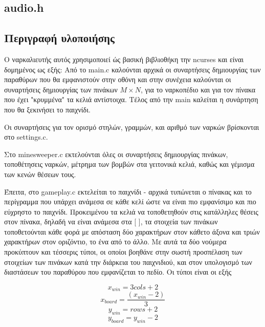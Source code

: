 \documentclass{article}
\begin{document}
    \subsection{audio.h}
        

    \subsection{Περιγραφή υλοποιήσης}

    Ο ναρκαλιευτής αυτός χρησιμοποιεί ώς βασική βιβλιοθήκη την ncurses και είναι δομημένος ως εξής:
    Από το main.c καλούνται αρχικά οι συναρτήσεις δημιουργίας των παραθύρων που θα εμφανιστούν
    στην οθόνη και στην συνέχεια καλούνται οι συναρτήσεις δημιουργίας των πινάκων $Μ \times N$,
    για το ναρκοπέδιο και για τον πίνακα που έχει "κρυμμένα" τα κελιά αντίστοιχα.
    Τέλος από την main καλείται η συνάρτηση που θα ξεκινήσει το παιχνίδι.  

    Οι συναρτήσεις για τον ορισμό στηλών, γραμμών, και αριθμό των ναρκών βρίσκονται στο settings.c.  

    Στο minesweeper.c εκτελούνται όλες οι συναρτήσεις δημιουργίας πινάκων, τοποθέτησεις ναρκών,
    μέτρημα των βομβών στα γειτονικά κελιά, καθώς και γέμισμα των κενών θέσεων τους.  

    Έπειτα, στο gameplay.c εκτελείται το παιχνίδι - αρχικά τυπώνεται ο πίνακας και το περίγραμμα που
    υπάρχει ανάμεσα σε κάθε κελί ώστε να είναι πιο εμφανίσιμο και πιο εύχρηστο το παιχνίδι. Προκειμένου
    τα κελιά να τοποθετηθούν στις κατάλληλες θέσεις στον πίνακα, δηλαδή να είναι ανάμεσα στα [ ],
    τα στοιχεία των πινάκων τοποθετούνται κάθε φορά με απόσταση δύο χαρακτήρων στον κάθετο άξονα και 
    τριών χαρακτήρων στον οριζόντιο, το ένα από το άλλο. Με αυτά τα δύο νούμερα προκύπτουν και τέσσερις 
    τύποι, οι οποίοι βοηθάνε στην σωστή προσπέλαση των στοιχείων των πινάκων κατά την διάρκεια του παιχνιδιού,
    και στον υπολογισμό των διαστάσεων του παραθύρου που εμφανίζεται το πεδίο. Οι τύποι είναι οι εξής

    \begin{equation}
        x_{win} = 3cols + 2
    \end{equation}
    \begin{equation}
        x_{board} = \frac{(x_{win}-2)}{3}
    \end{equation}
    \begin{equation}
        y_{win} = rows + 2
    \end{equation}
    \begin{equation}
        y_{board} = y_{win}-2
    \end{equation}
\end{document}
